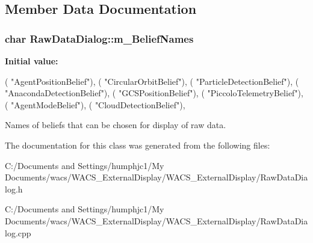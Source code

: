 \subsection{Member Data Documentation}
\hypertarget{class_raw_data_dialog_aadc315770f6c61cc4d00058f876dcd6c}{
\subsubsection[{m\_\-BeliefNames}]{\setlength{\rightskip}{0pt plus 5cm}char {\bf RawDataDialog::m\_\-BeliefNames}}}
\label{class_raw_data_dialog_aadc315770f6c61cc4d00058f876dcd6c}
{\bfseries Initial value:}
\begin{DoxyCode}
 {
                                                                                                        (
      "AgentPositionBelief\0"),
                                                                                                        (
      "CircularOrbitBelief\0"),
                                                                                                        (
      "ParticleDetectionBelief\0"),
                                                                                                        (
      "AnacondaDetectionBelief\0"),
                                                                                                        (
      "GCSPositionBelief\0"),
                                                                                                        (
      "PiccoloTelemetryBelief\0"),
                                                                                                        (
      "AgentModeBelief\0"),
                                                                                                        (
      "CloudDetectionBelief\0"),
                                                                                                        }
      
\end{DoxyCode}


Names of beliefs that can be chosen for display of raw data. 



The documentation for this class was generated from the following files:\begin{DoxyCompactItemize}
\item 
C:/Documents and Settings/humphjc1/My Documents/wacs/WACS\_\-ExternalDisplay/WACS\_\-ExternalDisplay/RawDataDialog.h\item 
C:/Documents and Settings/humphjc1/My Documents/wacs/WACS\_\-ExternalDisplay/WACS\_\-ExternalDisplay/RawDataDialog.cpp\end{DoxyCompactItemize}
